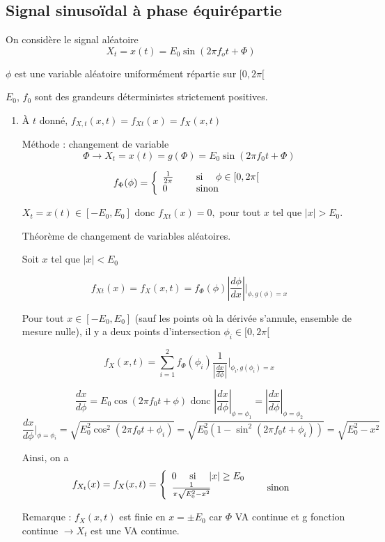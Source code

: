 \documentclass[main.tex]{subfiles}
\begin{document}
\subsection*{Signal sinusoïdal à phase équirépartie}
On considère le signal aléatoire \[X_t=x(t)=E_0\sin(2\pi f_o t + \Phi) \]

$\phi$ est une variable aléatoire uniformément répartie sur $[0,2\pi[$

$E_0$, $f_0$ sont des grandeurs déterministes strictement positives.

\begin{enumerate}
\item À $t$ donné, $f_{X,t}(x,t)=f_{Xt}(x)=f_X(x,t)$

Méthode : changement de variable
\[ \Phi \rightarrow X_t = x(t) = g(\Phi) = E_0\sin(2\pi f_0t + \Phi) \]

\[f_{\Phi}(\phi) = 
\left\{
\begin{array}{ll}
\frac{1}{2\pi} & \quad\text{ si }\quad \phi \in [0,2\pi[ \\
0 & \quad\text{ sinon}\quad
\end{array} 
\right.
\]

$X_t = x(t) \in [-E_0,E_0]$ donc $f_{Xt}(x) = 0,$ pour tout $x$ tel que $|x| >E_0$.

Théorème de changement de variables aléatoires.

Soit $x$ tel que $|x| < E_0$

\[f_{Xt}(x) = f_X(x,t) = f_{\Phi}(\phi)|\frac{d\phi}{dx}||_{\phi,g(\phi)=x}\]


Pour tout $x\in[-E_0,E_0]$ (sauf les points où la dérivée s'annule, ensemble de mesure nulle), il y a deux points d'intersection $\phi_i\in[0,2\pi[$

\[f_X(x,t) = \sum_{i=1}^2 f_{\Phi}(\phi_i)\frac{1}{|\frac{dx}{d\phi}|}|_{\phi_i,g(\phi_i)=x} \]

\[\frac{dx}{d\phi}=E_0\cos(2\pi f_0t + \phi) \text{ donc } 
|\frac{dx}{d\phi}|_{\phi=\phi_1} = |\frac{dx}{d\phi}|_{\phi=\phi_2}
\]
\[\frac{dx}{d\phi}|_{\phi=\phi_i} = \sqrt{E_0^2\cos^2(2\pi f_0t + \phi_i)}=\sqrt{E_0^2(1-\sin^2(2\pi f_0t + \phi_i))}=\sqrt{E_0^2-x^2}\]

Ainsi, on a 
\[f_{X_t}(x) = f_X(x,t) =
\left\{
\begin{array}{ll}
0 \quad\text{ si }\quad |x| \geq E_0 \\
\frac{1}{\pi \sqrt{E_0^2-x^2}} & \quad\text{ sinon}\quad
\end{array}
\right.
\]

Remarque : $f_X(x,t)$ est finie en $x=\pm E_0$ car $\Phi$ VA continue et g fonction continue $\rightarrow X_t$ est une VA continue.


\end{enumerate}
\end{document}
